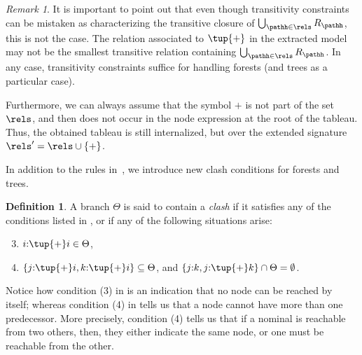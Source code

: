 \documentclass[10pt,a4paper]{amsart}
\theoremstyle{definition}
\newtheorem{defi}[thm]{Definition}
\theoremstyle{remark}
\newtheorem{rem}[thm]{Remark}
\begin{document}
\begin{rem}
     It is important to point out that even though transitivity constraints can be mistaken as characterizing the transitive closure of $\bigcup_{\pathh \in \rels} R_{\pathh}$, this is not the case. The relation associated to $\tup{+}$ in the extracted model may not be the smallest transitive relation containing $\bigcup_{\pathh \in \rels} R_{\pathh}$.
    In any case, transitivity constraints suffice for handling forests (and trees as a particular case).
    
    Furthermore, we can always assume that the symbol $+$ is not part of the set $\rels$, and then does not occur in the node expression at the root of the tableau. Thus, the obtained tableau is still internalized, but over the extended signature $\rels'=\rels\cup\{+\}$.
\end{rem}


In addition to the rules in~, we introduce new clash conditions for forests and trees.

\begin{defi}\label{def:clashf}
    A branch $\Theta$ is said to contain a \emph{clash} if it satisfies any of the conditions listed in , or if any of the following situations arise:
    \begin{enumerate}
        \setcounter{enumi}{2}
        \item $i{:}\tup{+}i \in \Theta$, 
        \item $\{j{:}\tup{+} i, k{:}\tup{+} i\} \subseteq \Theta$, and $\{j{:}k,j{:}\tup{+}k\}\cap\Theta = \emptyset$. %
    \end{enumerate}
\end{defi}

Notice how condition (3) in  is an indication that no node can be reached by itself; whereas condition (4) in  tells us that a node cannot have more than one predecessor. 
More precisely, condition (4) tells us that if a nominal is reachable from two others, then, they either indicate the same node, or one must be reachable from the other.
\end{document}
